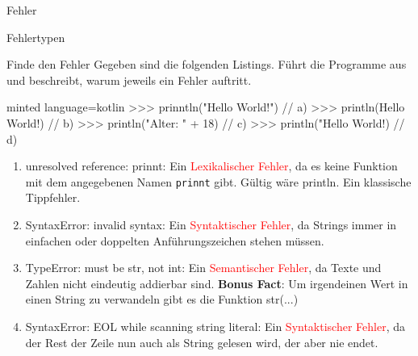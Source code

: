 \begin{task}[points=auto]{Fehler}
\begin{subtask*}[points=0]{Fehlertypen }
\begin{solution}
        \end{solution}
    \end{subtask*}
    \begin{subtask*}[points=0]{Finde den Fehler }
        Gegeben sind die folgenden Listings. Führt die Programme aus und beschreibt, warum jeweils ein Fehler auftritt.
        \begin{codeBlock}[]{minted language=kotlin}
            >>> prinntln("Hello World!") // a)
            >>> println(Hello World!)    // b)
            >>> println("Alter: " + 18)  // c)
            >>> println("Hello World!)   // d)
        \end{codeBlock}
        \begin{solution}
            \begin{enumerate}
                \item {\ttfamily unresolved reference: prinnt}: Ein \textcolor{red}{Lexikalischer Fehler}, da es keine Funktion mit dem angegebenen Namen
                    \texttt	{prinnt} gibt. Gültig wäre {\ttfamily println}. Ein klassische Tippfehler.
                \item {\ttfamily SyntaxError: invalid syntax}: Ein \textcolor{red}{Syntaktischer Fehler}, da Strings immer in einfachen oder doppelten Anführungszeichen
                    stehen müssen.
                \item {\ttfamily TypeError: must be str, not int}: Ein \textcolor{red}{Semantischer Fehler}, da Texte und Zahlen nicht eindeutig addierbar sind.
                    \textbf{Bonus Fact}: Um irgendeinen Wert in einen String zu verwandeln gibt es die Funktion {\ttfamily str(...)}
                \item {\ttfamily SyntaxError: EOL while scanning string literal}: Ein \textcolor{red}{Syntaktischer Fehler}, da der Rest der Zeile nun auch als String
                    gelesen wird, der aber nie endet.
            \end{enumerate}

        \end{solution}
    \end{subtask*}
\end{task}
